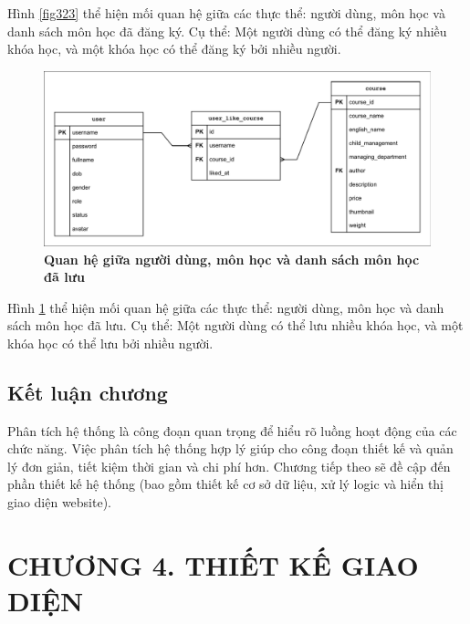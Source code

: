 \documentclass{article}
\begin{document}
	 Hình \ref{fig323} thể hiện mối quan hệ giữa các thực thể: người dùng, môn học và danh sách môn học đã đăng ký. Cụ thể: Một người dùng có thể đăng ký nhiều khóa học, và một khóa học có thể đăng ký bởi nhiều người.
	 
	 \begin{figure}[!ht]
	 	\centering
	 	\includegraphics[trim= 10pt 10pt 10pt 10pt, clip, width=15.5cm]{edr_fig324.pdf}
	 	\caption [Quan hệ giữa người dùng, môn học và danh sách môn học đã lưu]{\bfseries \fontsize{12pt}{0pt}\selectfont Quan hệ giữa người dùng, môn học và danh sách môn học đã lưu}
	 	\label{fig324}
	 \end{figure}
	 
	 Hình \ref{fig324} thể hiện mối quan hệ giữa các thực thể: người dùng, môn học và danh sách môn học đã lưu. Cụ thể: Một người dùng có thể lưu nhiều khóa học, và một khóa học có thể lưu bởi nhiều người.
	 
	 \subsection{Kết luận chương}
	 
	 Phân tích hệ thống là công đoạn quan trọng để hiểu rõ luồng hoạt động của các chức năng. Việc phân tích hệ thống hợp lý giúp cho công đoạn thiết kế và quản lý đơn giản, tiết kiệm thời gian và chi phí hơn. Chương tiếp theo sẽ đề cập đến phần thiết kế hệ thống (bao gồm thiết kế cơ sở dữ liệu, xử lý logic và hiển thị giao diện website).
	 \newpage
	 
	 \section*{CHƯƠNG 4. THIẾT KẾ GIAO DIỆN}
	 \setcounter{section}{4}
	 \setcounter{subsection}{0}
	 \setcounter{figure}{0}
	 \setcounter{table}{0}
	 
\end{document}
